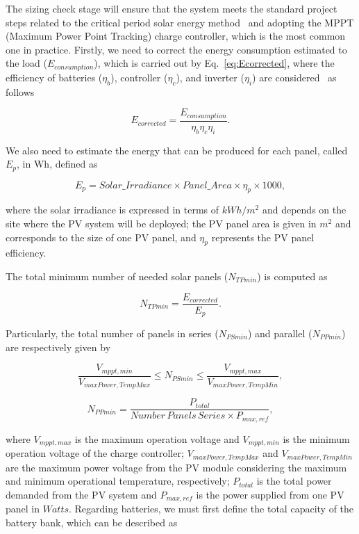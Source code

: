 \documentclass[runningheads]{llncs}
\begin{document}
The sizing check stage will ensure that the system meets the standard project steps related to the critical period solar energy method~\cite{Pinho} and adopting the MPPT (Maximum Power Point Tracking) charge controller, which is the most common one in practice. 
%
Firstly, we need to correct the energy consumption estimated to the load ($E_{consumption}$), which is carried out by Eq.~\ref{eq:Ecorrected}, where the efficiency of batteries ($\eta_{b}$), controller ($\eta_{c}$), and inverter ($\eta_{i}$) are considered~\cite{Pinho} as follows

\begin{equation}
\label{eq:Ecorrected}
E_{corrected} = \frac {E_{consumption}}{\eta_{b} \eta_{c} \eta_{i} }.
\end{equation}

We also need to estimate the energy that can be produced for each panel, called $E_{p}$, in Wh, defined as

\begin{equation}
\label{eq:Ep}
E_{p} = Solar\_Irradiance \times Panel\_Area \times \eta_{p} \times 1000,
\end{equation}

\noindent where the solar irradiance is expressed in terms of $kWh/m^{2}$ and depends on the site where the PV system will be deployed; 
the PV panel area is given in $m^{2}$ and corresponds to the size of one PV panel, and $\eta_{p}$ represents the PV panel efficiency.

The total minimum number of needed solar panels ($N_{TPmin}$) is computed as

\begin{equation}
\label{eq:NTPmin}
N_{TPmin} = \frac{E_{corrected}}{E_{p}}.
\end{equation}

Particularly, the total number of panels in series ($N_{PSmin}$) and parallel ($N_{PPmin}$) are respectively given by

\begin{equation}
\label{eq:NPSmin}
\frac{V_{mppt,min}}{V_{maxPower,TempMax}} \leq N_{PSmin} \leq \frac{V_{mppt,max}}{V_{maxPower,TempMin}},
\end{equation}

\begin{equation}
\label{eq:NPPmin}
N_{PPmin} = \frac{P_{total}}{Number\,Panels\,Series \times P_{max,ref}},
\end{equation}

\noindent where $V_{mppt,max}$ is the maximum operation voltage and $V_{mppt,min}$ is the minimum operation voltage of the charge controller; $V_{maxPower,TempMax}$ and $V_{maxPower,TempMin}$ are the maximum power voltage from the PV module considering the maximum and minimum operational temperature, respectively; $P_{total}$ is the total power demanded from the PV system and $P_{max,ref}$ is the power supplied from one PV panel in $Watts$.
%
Regarding batteries, we must first define the total capacity of the battery bank, which can be described as
\end{document}
